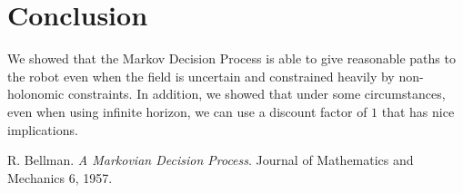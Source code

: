 \documentclass[10pt,a4paper,oneside]{article}
\begin{document}
\section{Conclusion}
We showed that the Markov Decision Process is able to give reasonable paths
to the robot even when the field is uncertain and constrained heavily by
non-holonomic constraints. In addition, we showed that under some circumstances,
even when using infinite horizon, we can use a discount factor of $1$ that has
nice implications.

\begin{thebibliography}{100}

  R. Bellman. \emph{A Markovian Decision Process}. Journal of Mathematics and
  Mechanics 6, 1957.

\end{thebibliography}
\end{document}
